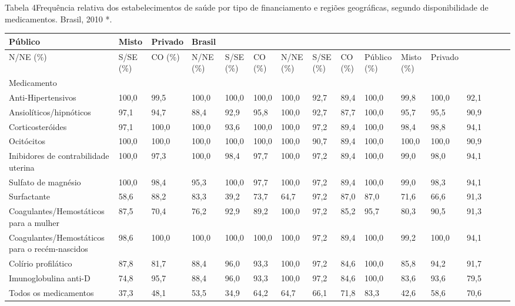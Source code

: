 \documentclass{article}
\begin{document}
Tabela 4Frequência relativa dos estabelecimentos de saúde por tipo de
financiamento e regiões geográficas, segundo disponibilidade de
medicamentos. Brasil, 2010 *.
\begin{table}
\begin{xtabular}{ l | l | l | l l | l | l | l | l | l | l | l | l | l | l | l }
\hline
Público & Misto & Privado & Brasil\\ \hline
N/NE (\%) & S/SE (\%) & CO (\%) & N/NE (\%) & S/SE (\%) & CO (\%) & N/NE (\%) &
S/SE (\%) & CO (\%) & Público (\%) & Misto (\%) & Privado\\ \hline
Medicamento
&
&
&
&
&
&
&
&
&
&
&
&
\\ \hline

Anti-Hipertensivos
& 100,0
& 99,5
& 100,0
& 100,0
& 100,0
& 100,0
& 92,7
& 89,4
& 100,0
& 99,8
& 100,0
& 92,1
\\ \hline

Ansiolíticos/hipnóticos
& 97,1
& 94,7
& 88,4
& 92,9
& 95,8
& 100,0
& 92,7
& 87,7
& 100,0
& 95,7
& 95,5
& 90,9
\\ \hline

Corticosteróides
& 97,1
& 100,0
& 100,0
& 93,6
& 100,0
& 100,0
& 97,2
& 89,4
& 100,0
& 98,4
& 98,8
& 94,1
\\ \hline

Ocitócitos
& 100,0
& 100,0
& 100,0
& 100,0
& 100,0
& 100,0
& 90,7
& 89,4
& 100,0
& 100,0
& 100,0
& 90,9
\\ \hline

Inibidores de contrabilidade uterina
& 100,0
& 97,3
& 100,0
& 98,4
& 97,7
& 100,0
& 97,2
& 89,4
& 100,0
& 99,0
& 98,0
& 94,1
\\ \hline

Sulfato de magnésio
& 100,0
& 98,4
& 95,3
& 100,0
& 97,7
& 100,0
& 97,2
& 89,4
& 100,0
& 99,0
& 98,3
& 94,1
\\ \hline

Surfactante
& 58,6
& 88,2
& 83,3
& 39,2
& 73,7
& 64,7
& 97,2
& 87,0
& 87,0
& 71,6
& 66,6
& 91,3
\\ \hline

Coagulantes/Hemostáticos para a mulher
& 87,5
& 70,4
& 76,2
& 92,9
& 89,2
& 100,0
& 97,2
& 85,2
& 95,7
& 80,3
& 90,5
& 91,3
\\ \hline

Coagulantes/Hemostáticos para o
recém-nascidos
& 98,6
& 100,0
& 100,0
& 100,0
& 100,0
& 100,0
& 97,2
& 89,4
& 100,0
& 99,2
& 100,0
& 94,1
\\ \hline

Colírio profilático
& 87,8
& 81,7
& 88,4
& 96,0
& 93,3
& 100,0
& 97,2
& 84,6
& 100,0
& 85,8
& 94,2
& 91,7
\\ \hline

Imunoglobulina anti-D
& 74,8
& 95,7
& 88,4
& 96,0
& 93,3
& 100,0
& 97,2
& 84,6
& 100,0
& 83,6
& 93,6
& 79,5
\\ \hline

Todos os medicamentos
& 37,3
& 48,1
& 53,5
& 34,9
& 64,2
& 64,7
& 66,1
& 71,8
& 83,3
& 42,6
& 58,6
& 70,6
\\ \hline

\end{xtabular}
\end{table}
\end{document}
